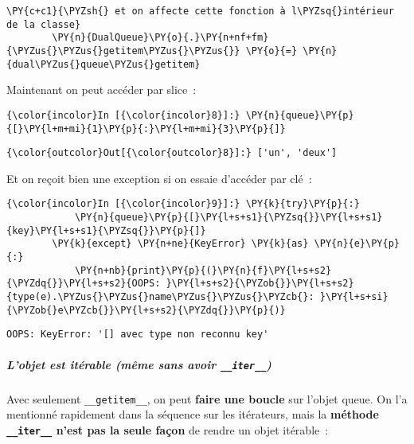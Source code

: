\begin{Verbatim}[commandchars=\\\{\}]
        \PY{c+c1}{\PYZsh{} et on affecte cette fonction à l\PYZsq{}intérieur de la classe}
        \PY{n}{DualQueue}\PY{o}{.}\PY{n+nf+fm}{\PYZus{}\PYZus{}getitem\PYZus{}\PYZus{}} \PY{o}{=} \PY{n}{dual\PYZus{}queue\PYZus{}getitem}
\end{Verbatim}


    Maintenant on peut accéder par slice~:

    \begin{Verbatim}[commandchars=\\\{\}]
{\color{incolor}In [{\color{incolor}8}]:} \PY{n}{queue}\PY{p}{[}\PY{l+m+mi}{1}\PY{p}{:}\PY{l+m+mi}{3}\PY{p}{]}
\end{Verbatim}


\begin{Verbatim}[commandchars=\\\{\}]
{\color{outcolor}Out[{\color{outcolor}8}]:} ['un', 'deux']
\end{Verbatim}
            
    Et on reçoit bien une exception si on essaie d'accéder par clé~:

    \begin{Verbatim}[commandchars=\\\{\}]
{\color{incolor}In [{\color{incolor}9}]:} \PY{k}{try}\PY{p}{:}
            \PY{n}{queue}\PY{p}{[}\PY{l+s+s1}{\PYZsq{}}\PY{l+s+s1}{key}\PY{l+s+s1}{\PYZsq{}}\PY{p}{]}
        \PY{k}{except} \PY{n+ne}{KeyError} \PY{k}{as} \PY{n}{e}\PY{p}{:}
            \PY{n+nb}{print}\PY{p}{(}\PY{n}{f}\PY{l+s+s2}{\PYZdq{}}\PY{l+s+s2}{OOPS: }\PY{l+s+s2}{\PYZob{}}\PY{l+s+s2}{type(e).\PYZus{}\PYZus{}name\PYZus{}\PYZus{}\PYZcb{}: }\PY{l+s+si}{\PYZob{}e\PYZcb{}}\PY{l+s+s2}{\PYZdq{}}\PY{p}{)}
\end{Verbatim}


    \begin{Verbatim}[commandchars=\\\{\}]
OOPS: KeyError: '[] avec type non reconnu key'

    \end{Verbatim}

    \hypertarget{lobjet-est-ituxe9rable-muxeame-sans-avoir-__iter__}{%
\subparagraph{\texorpdfstring{L'objet est itérable (même sans avoir
\texttt{\_\_iter\_\_})}{L'objet est itérable (même sans avoir \_\_iter\_\_)}}\label{lobjet-est-ituxe9rable-muxeame-sans-avoir-__iter__}}

    Avec seulement \texttt{\_\_getitem\_\_}, on peut \textbf{faire une
boucle} sur l'objet queue. On l'a mentionné rapidement dans la séquence
sur les itérateurs, mais la \textbf{méthode \texttt{\_\_iter\_\_} n'est
pas la seule façon} de rendre un objet itérable~:

